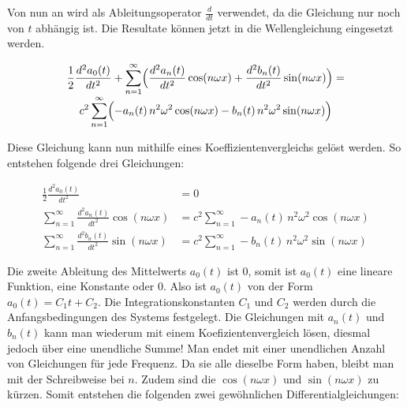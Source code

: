 Von nun an wird als Ableitungsoperator $\frac{d}{dt}$ verwendet, da die Gleichung nur noch von $t$ abhängig ist.
Die Resultate können jetzt in die Wellengleichung eingesetzt werden. 



\begin{multline}
	\frac{1}{2}\frac{d^2 a_0(t)}{dt^2}
	+ \sum_{n=1}^{\infty}\Bigl(
	\frac{d^2 a_n(t)}{dt^2}\cos(n\omega x)
	+ \frac{d^2 b_n(t)}{dt^2}\sin(n\omega x)
	\Bigr)
	= \\[-0.8ex]
	c^2 \sum_{n=1}^{\infty}\Bigl(
	-a_n(t)\,n^2\omega^2\cos(n\omega x)
	-b_n(t)\,n^2\omega^2\sin(n\omega x)
	\Bigr)
\end{multline}


Diese Gleichung kann nun mithilfe eines Koeffizientenvergleichs gelöst werden.
So entstehen folgende drei Gleichungen:

\begin{equation}
	\begin{aligned}
		\frac{1}{2} \frac{d^2 a_0(t)}{d t^2} &= 0 \\
		\sum_{n=1}^{\infty}\frac{d^2 a_n(t)}{dt^2}\cos(n\omega x) &= c^2 \sum_{n=1}^{\infty}-a_n(t)\,n^2\omega^2\cos(n\omega x)\\
		\sum_{n=1}^{\infty}\frac{d^2 b_n(t)}{dt^2}\sin(n\omega x) &= c^2 \sum_{n=1}^{\infty}-b_n(t)\,n^2\omega^2\sin(n\omega x)
	\end{aligned}
\end{equation}


Die zweite Ableitung des Mittelwerts $a_0(t)$ ist 0, somit ist $a_0(t)$ eine lineare Funktion, eine Konstante oder 0. Also ist $a_0(t)$ von der Form $a_0(t)=C_1 t + C_2$.
Die Integrationskonstanten $C_1$ und $C_2$ werden durch die Anfangsbedingungen des Systems festgelegt.
Die Gleichungen mit $a_n(t)$ und $b_n(t)$ kann man wiederum mit einem Koefizientenvergleich lösen, diesmal jedoch über eine unendliche Summe! Man endet mit einer unendlichen Anzahl von Gleichungen für jede Frequenz. Da sie alle dieselbe Form haben, bleibt man mit der Schreibweise bei $n$.
Zudem sind die $\cos(n\omega x)$ und $\sin(n\omega x)$ zu kürzen. 
Somit entstehen die folgenden zwei gewöhnlichen Differentialgleichungen:

